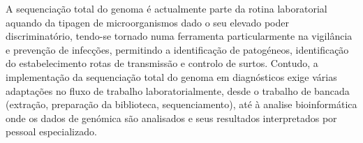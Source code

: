 A sequenciação total do genoma é actualmente parte da rotina laboratorial aquando da tipagen de microorganismos dado o seu elevado poder discriminatório, tendo-se tornado numa ferramenta particularmente na vigilância e prevenção de infecções, permitindo a identificação  de patogéneos, identificação do estabelecimento rotas de transmissão e controlo de surtos. Contudo, a implementação da sequenciação total do genoma em diagnósticos exige várias adaptações no fluxo de trabalho laboratorialmente, desde o trabalho de bancada (extração, preparação da biblioteca, sequenciamento), até à analise bioinformática onde os dados de genómica são analisados e seus resultados interpretados por pessoal especializado.